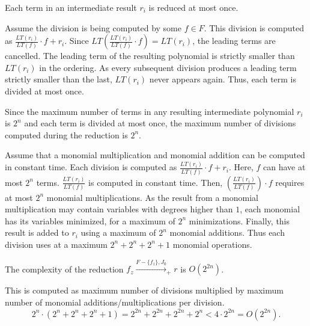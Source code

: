 \begin{Lemma}\label{lem:maxDivsPerLT}
Each term in an intermediate result $r_i$ is reduced at most once.
\end{Lemma}
\begin{Proof}
Assume the division is being computed by some $f\in F$. 
This division is computed as $\frac{LT(r_i)}{LT(f)}\cdot f+r_i$.
Since $LT(\frac{LT(r_i)}{LT(f)}\cdot f)=LT(r_i)$, the leading terms 
are cancelled. 
The leading term of the resulting
polynomial is strictly smaller than $LT(r_i)$ in the ordering.
As every subsequent division produces a leading term strictly smaller
than the last, $LT(r_i)$ never appears again.
Thus, each term is divided at most once.
\end{Proof}

\begin{Lemma}
Since the maximum number of terms in any resulting intermediate polynomial $r_i$ is 
$2^n$ and each term is divided at most once, the maximum number of divisions computed
during the reduction is $2^n$.
\end{Lemma}

Assume that a monomial multiplication and monomial addition can be computed
in constant time. Each division is computed as $\frac{LT(r_i)}{LT(f)}\cdot f+r_i$.
Here, $f$ can have at most $2^n$ terms. $\frac{LT(r_i)}{LT(f)}$ is computed in
constant time. Then, $(\frac{LT(r_i)}{LT(f)})\cdot f$ requires at most $2^n$ 
monomial multiplications. As the result from a monomial multiplication may contain variables with
degrees higher than $1$, each monomial has its variables minimized, for a maximum of $2^n$ minimizations.
Finally, this result is added to $r_i$ using a maximum of $2^n$ monomial additions.
Thus each division uses at a maximum $2^n+2^n+2^n+1$ monomial operations.

\begin{Lemma}
The complexity of the reduction $f_z\xrightarrow{F-\{f_z\},J_0}_+ r$ is $O(2^{2n})$.
\end{Lemma}
\begin{Proof}
This is computed as maximum number of divisions multiplied by maximum number of
monomial additions/multiplications per division.
\begin{equation}
2^{n}\cdot (2^n+2^n+2^n+1)=2^{2n}+2^{2n}+2^{2n}+2^{n}<4\cdot 2^{2n}=O(2^{2n}).
\end{equation}
\end{Proof}

